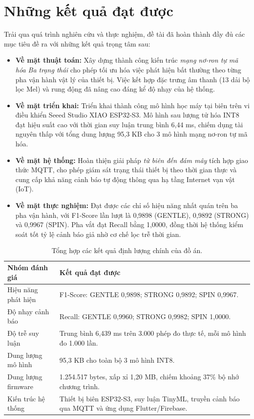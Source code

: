 \label{chap:ket_luan}

\section{Những kết quả đạt được}

Trải qua quá trình nghiên cứu và thực nghiệm, đề tài đã hoàn thành đầy đủ các mục tiêu đề ra với những kết quả trọng tâm sau:

\begin{itemize}
    \item \textbf{Về mặt thuật toán:} Xây dựng thành công kiến trúc \textit{mạng nơ-ron tự mã hóa Ba trạng thái} cho phép tối ưu hóa việc phát hiện bất thường theo từng pha vận hành vật lý của thiết bị. Việc kết hợp đặc trưng âm thanh (13 dải bộ lọc Mel) và rung động đã nâng cao đáng kể độ nhạy của hệ thống.
    \item \textbf{Về mặt triển khai:} Triển khai thành công mô hình học máy tại biên trên vi điều khiển Seeed Studio XIAO ESP32-S3. Mô hình sau lượng tử hóa INT8 đạt hiệu suất cao với thời gian suy luận trung bình 6,44 ms, chiếm dụng tài nguyên thấp với tổng dung lượng 95,3 KB cho 3 mô hình mạng nơ-ron tự mã hóa.
    \item \textbf{Về mặt hệ thống:} Hoàn thiện giải pháp \textit{từ biên đến đám mây} tích hợp giao thức MQTT, cho phép giám sát trạng thái thiết bị theo thời gian thực và cung cấp khả năng cảnh báo tự động thông qua hạ tầng Internet vạn vật (IoT).
    \item \textbf{Về mặt thực nghiệm:} Đạt được các chỉ số hiệu năng nhất quán trên ba pha vận hành, với F1-Score lần lượt là 0,9898 (GENTLE), 0,9892 (STRONG) và 0,9967 (SPIN). Pha vắt đạt Recall bằng 1,0000, đồng thời hệ thống kiểm soát tốt tỷ lệ cảnh báo giả nhờ cơ chế lọc trễ thời gian.
\end{itemize}

\begin{table}[H]
    \centering
    \caption{Tổng hợp các kết quả định lượng chính của đồ án.}
    \label{tab:final_summary_metrics}
    \begin{tabular}{lp{9.5cm}}
        \hline
        \textbf{Nhóm đánh giá} & \textbf{Kết quả đạt được} \\
        \hline
        Hiệu năng phát hiện & F1-Score: GENTLE 0,9898; STRONG 0,9892; SPIN 0,9967. \\
        Độ nhạy cảnh báo & Recall: GENTLE 0,9960; STRONG 0,9982; SPIN 1,0000. \\
        Độ trễ suy luận & Trung bình 6,439 ms trên 3.000 phép đo thực tế, mỗi mô hình đo 1.000 lần. \\
        Dung lượng mô hình & 95,3 KB cho toàn bộ 3 mô hình INT8. \\
        Dung lượng firmware & 1.254.517 bytes, xấp xỉ 1,20 MB, chiếm khoảng 37\% bộ nhớ chương trình. \\
        Kiến trúc hệ thống & Thiết bị biên ESP32-S3, suy luận TinyML, truyền cảnh báo qua MQTT và ứng dụng Flutter/Firebase. \\
        \hline
    \end{tabular}
\end{table}
